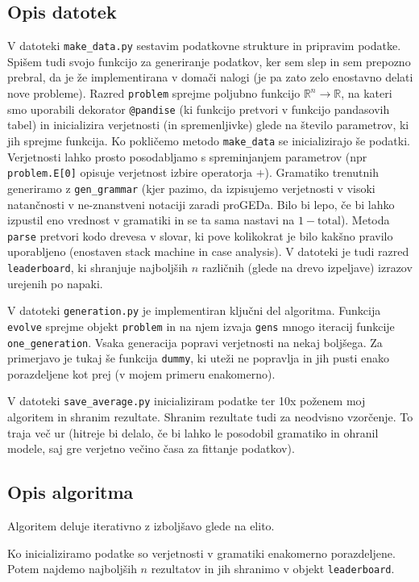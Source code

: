 \documentclass{article}
\begin{document}
\subsection*{Opis datotek} V datoteki \verb|make_data.py| sestavim podatkovne strukture in pripravim podatke. Spišem tudi svojo funkcijo za generiranje podatkov, ker sem slep in sem prepozno prebral, da je že implementirana v domači nalogi (je pa zato zelo enostavno delati nove probleme). Razred \verb|problem| sprejme poljubno funkcijo \(\mathbb R^n\to \mathbb R\), na kateri smo uporabili dekorator \verb|@pandise| (ki funkcijo pretvori v funkcijo pandasovih tabel) in inicializira verjetnosti (in spremenljivke) glede na število parametrov, ki jih sprejme funkcija. Ko pokličemo metodo \verb|make_data| se inicializirajo še podatki. Verjetnosti lahko prosto posodabljamo s spreminjanjem parametrov (npr \verb|problem.E[0]| opisuje verjetnost izbire operatorja \(+\)). Gramatiko trenutnih generiramo z \verb|gen_grammar| (kjer pazimo, da izpisujemo verjetnosti v visoki natančnosti v ne-znanstveni notaciji zaradi proGEDa. Bilo bi lepo, če bi lahko izpustil eno vrednost v gramatiki in se ta sama nastavi na \(1-\text{total}\)). Metoda \verb|parse| pretvori kodo drevesa v slovar, ki pove kolikokrat je bilo kakšno pravilo uporabljeno (enostaven stack machine in case analysis). V datoteki je tudi razred \verb|leaderboard|, ki shranjuje najboljših \(n\) različnih (glede na drevo izpeljave) izrazov urejenih po napaki.

V datoteki \verb|generation.py| je implementiran ključni del algoritma. Funkcija \verb|evolve| sprejme objekt \verb|problem| in na njem izvaja \verb|gens| mnogo iteracij funkcije \verb|one_generation|. Vsaka generacija popravi verjetnosti na nekaj boljšega. Za primerjavo je tukaj še funkcija \verb|dummy|, ki uteži ne popravlja in jih pusti enako porazdeljene kot prej (v mojem primeru enakomerno).

V datoteki \verb|save_average.py| inicializiram podatke ter 10x poženem moj algoritem in shranim rezultate. Shranim rezultate tudi za neodvisno vzorčenje. To traja več ur (hitreje bi delalo, če bi lahko le posodobil gramatiko in ohranil modele, saj gre verjetno večino časa za fittanje podatkov).

\subsection*{Opis algoritma} Algoritem deluje iterativno z izboljšavo glede na elito.

Ko inicializiramo podatke so verjetnosti v gramatiki enakomerno porazdeljene. Potem najdemo najboljših \(n\) rezultatov in jih shranimo v objekt \texttt{leaderboard}. 
\end{document}
